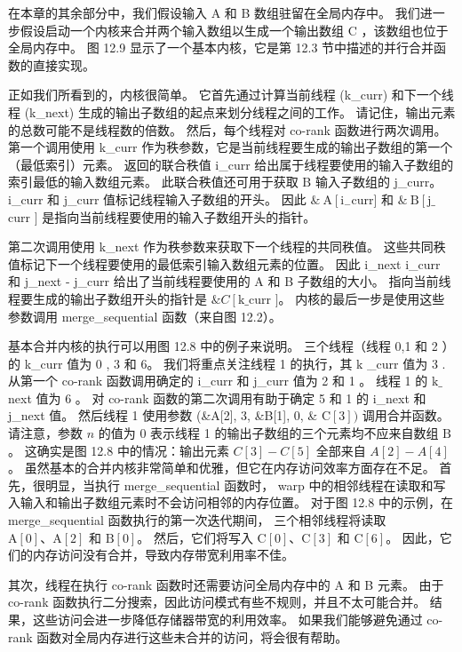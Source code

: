 在本章的其余部分中，我们假设输入 A 和 B 数组驻留在全局内存中。 
我们进一步假设启动一个内核来合并两个输入数组以生成一个输出数组 $\mathrm{C}$ ，该数组也位于全局内存中。 
图 12.9 显示了一个基本内核，它是第 12.3 节中描述的并行合并函数的直接实现。

正如我们所看到的，内核很简单。 
它首先通过计算当前线程 (k\_curr) 和下一个线程 (k\_next) 生成的输出子数组的起点来划分线程之间的工作。 
请记住，输出元素的总数可能不是线程数的倍数。 然后，每个线程对 co-rank 函数进行两次调用。
第一个调用使用 k\_curr 作为秩参数，它是当前线程要生成的输出子数组的第一个（最低索引）元素。 
返回的联合秩值 i\_curr 给出属于线程要使用的输入子数组的索引最低的输入数组元素。 
此联合秩值还可用于获取 $\mathrm{B}$ 输入子数组的 j\_curr。 i\_curr 和 j\_curr 值标记线程输入子数组的开头。 
因此 $\&\mathrm{~A}\left[\mathrm{i}_{-}\right.$curr] 
和 $\&\mathrm{~B}\left[\mathrm{j} \_\right .$curr $]$ 是指向当前线程要使用的输入子数组开头的指针。

第二次调用使用 k\_next 作为秩参数来获取下一个线程的共同秩值。 
这些共同秩值标记下一个线程要使用的最低索引输入数组元素的位置。 
因此 i\_next i\_curr 和 j\_next - j\_curr 给出了当前线程要使用的 A 和 B 子数组的大小。 
指向当前线程要生成的输出子数组开头的指针是 $\& C\left[\mathrm{k} \_\right.$curr $]$。 
内核的最后一步是使用这些参数调用 merge\_sequential 函数（来自图 12.2）。

基本合并内核的执行可以用图 12.8 中的例子来说明。 三个线程（线程 0,1 和 2 ）的 k\_curr 值为 0 , 3 和 6。
我们将重点关注线程 1 的执行，其 $\mathrm{k}$ \_curr 值为 3 . 
从第一个 co-rank 函数调用确定的 i\_curr 和 j\_curr 值为 2 和 1 。 
线程 1 的 $\mathrm{k} \_$next 值为 6 。 
对 co-rank 函数的第二次调用有助于确定 5 和 1 的 i\_next 和 j\_next 值。 
然后线程 1 使用参数 (\&A[2], 3, \&B[1], 0, \& $\mathrm{C}[3])$ 调用合并函数。 
请注意，参数 $n$ 的值为 0 表示线程 1 的输出子数组的三个元素均不应来自数组 $\mathrm{B}$。 
这确实是图 12.8 中的情况：输出元素 $C[3]-C[5]$ 全部来自 $A[2]-A[4]$。 
虽然基本的合并内核非常简单和优雅，但它在内存访问效率方面存在不足。 
首先，很明显，当执行 merge\_sequential 函数时，
warp 中的相邻线程在读取和写入输入和输出子数组元素时不会访问相邻的内存位置。 
对于图 12.8 中的示例，在 merge\_sequential 函数执行的第一次迭代期间，
三个相邻线程将读取 $\mathrm{A}[0]、\mathrm{A}[2]$ 和 $\mathrm {B}[0]$。 
然后，它们将写入 $\mathrm{C}[0]、\mathrm{C}[3]$ 和 $\mathrm{C}[6]$。 
因此，它们的内存访问没有合并，导致内存带宽利用率不佳。

其次，线程在执行 co-rank 函数时还需要访问全局内存中的 A 和 B 元素。 
由于 co-rank 函数执行二分搜索，因此访问模式有些不规则，并且不太可能合并。 
结果，这些访问会进一步降低存储器带宽的利用效率。 
如果我们能够避免通过 co-rank 函数对全局内存进行这些未合并的访问，将会很有帮助。

